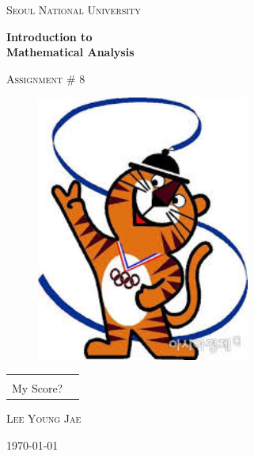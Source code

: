 \documentclass{article}
\begin{document}
\begin{titlepage}
\centering
{\scshape\LARGE Seoul National University \par}
\vspace{1.5cm}
{\huge\bfseries Introduction to\\Mathematical Analysis\par}
\vspace{1cm}
{\scshape\Large Assignment \# 8\par}

\vspace{1cm}

\begin{figure}[ht!]
\centering
\includegraphics[width=70mm]{suho.jpeg}
\end{figure}

\vspace{1cm}

\arrayrulewidth=1.2pt
\begin{tabular}{p{2.5cm}p{2cm}}
\centering
& \\
\cline{2-2}
\vspace{-.73cm}
My Score? & \\
\end{tabular}



\vfill
{}
\vspace{.7cm}\par
\textsc{\large Lee Young Jae}
\vspace{.7cm}\par
{\Large \today\par}
\end{titlepage}

\setlength{\parindent}{0cm}
\end{document}
